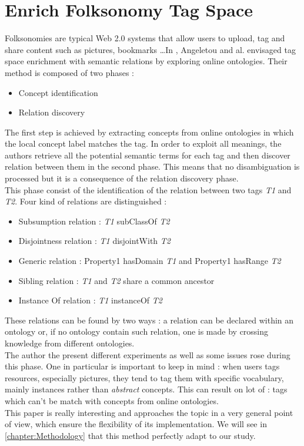 \section{Enrich Folksonomy Tag Space} %
\label{sec:enrich_folksonomy_tag_space}
Folksonomies are typical Web 2.0 systems that allow users to upload, tag and share content such as pictures, bookmarks \dots In \cite{angeletou2007bridging}, Angeletou and al. envisaged tag space enrichment with semantic relations by exploring online ontologies. Their method is composed of two phases :
\begin{itemize}
	\item Concept identification 
	\item Relation discovery
\end{itemize}
The first step is achieved by extracting concepts from online ontologies in which the local concept label matches the tag. In order to exploit all meanings, the authors retrieve all the potential semantic terms for each tag and then discover relation between them in the second phase. This means that no disambiguation is processed but it is a consequence of the relation discovery phase.\\
This phase consist of the identification of the relation between two tags \emph{T1} and \emph{T2}. Four kind of relations are distinguished :
\begin{itemize}
	\item Subsumption relation : \emph{T1} subClassOf \emph{T2}
	\item Disjointness relation : \emph{T1} disjointWith \emph{T2}
	\item Generic relation : Property1 hasDomain \emph{T1} and Property1 hasRange \emph{T2}
	\item Sibling relation : \emph{T1} and \emph{T2} share a common ancestor
	\item Instance Of relation : \emph{T1} instanceOf \emph{T2}
\end{itemize}
These relations can be found by two ways : a relation can be declared within an ontology or, if no ontology contain such relation, one is made by crossing knowledge from different ontologies.\\
The author the present different experiments as well as some issues rose during this phase. One in particular is important to keep in mind : when users tags resources, especially pictures, they tend to tag them with specific vocabulary, mainly instances rather than \emph{abstract} concepts. This can result on lot of  : tags which can't be match with concepts from online ontologies.\\
This paper is really interesting and approaches the topic in a very general point of view, which ensure the flexibility of its implementation. We will see in \ref{chapter:Methodology} that this method perfectly adapt to our study. 
